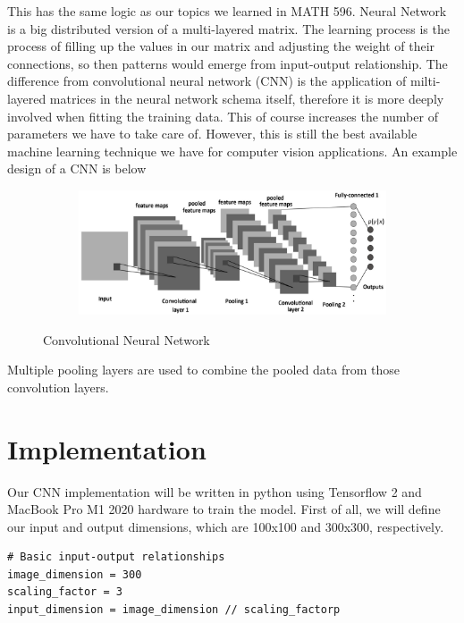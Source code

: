 \documentclass[12pt]{article}
\begin{document}
This has the same logic as our topics we learned in MATH 596. Neural Network is a
big distributed version of a multi-layered matrix. The learning process is the process
of filling up the values in our matrix and adjusting the weight of their connections,
so then patterns would emerge from input-output relationship. The difference from
convolutional neural network (CNN) is the application of milti-layered matrices in the
neural network schema itself, therefore it is more deeply involved when fitting the
training data. This of course increases the number of parameters we have to take care
of. However, this is still the best available machine learning technique we have for
computer vision applications. An example design of a CNN is below

\begin{figure}[h!]
	\centering
	\begin{subfigure}[b]{0.75\textwidth}
		\includegraphics[width=\textwidth]{./cnn.png}
	\end{subfigure}
	\caption{Convolutional Neural Network}
\end{figure}

Multiple pooling layers are used to combine the pooled data from those convolution
layers.

\section*{Implementation}
\label{sec:orgc401cc5}
Our CNN implementation will be written in python using Tensorflow 2 and MacBook Pro M1
2020 hardware to train the model. First of all, we will define our input and output
dimensions, which are 100x100 and 300x300, respectively.

\begin{verbatim}
# Basic input-output relationships
image_dimension = 300
scaling_factor = 3
input_dimension = image_dimension // scaling_factorp
\end{verbatim}
\end{document}
